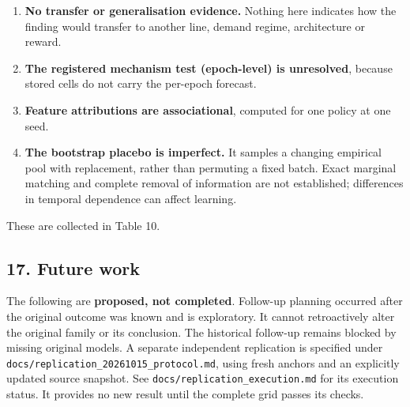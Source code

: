 \documentclass[
]{article}
\begin{document}
\begin{enumerate}
\item
  \textbf{No transfer or generalisation evidence.} Nothing here
  indicates how the finding would transfer to another line, demand
  regime, architecture or reward.
\item
  \textbf{The registered mechanism test (epoch-level) is unresolved},
  because stored cells do not carry the per-epoch forecast.
\item
  \textbf{Feature attributions are associational}, computed for one
  policy at one seed.
\item
  \textbf{The bootstrap placebo is imperfect.} It samples a changing
  empirical pool with replacement, rather than permuting a fixed batch.
  Exact marginal matching and complete removal of information are not
  established; differences in temporal dependence can affect learning.
\end{enumerate}

These are collected in Table 10.

\subsection{17. Future work}\label{17-future-work}

The following are \textbf{proposed, not completed}. Follow-up planning
occurred after the original outcome was known and is exploratory. It
cannot retroactively alter the original family or its conclusion. The
historical follow-up remains blocked by missing original models. A
separate independent replication is specified under
\texttt{docs/replication\_20261015\_protocol.md}, using fresh anchors
and an explicitly updated source snapshot. See
\texttt{docs/replication\_execution.md} for its execution status. It
provides no new result until the complete grid passes its checks.
\end{document}
